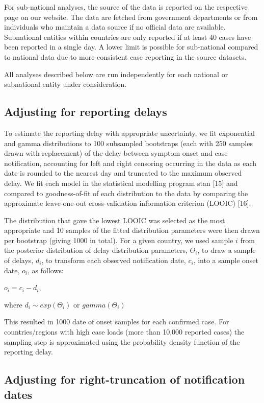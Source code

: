 \documentclass[
]{article}
\begin{document}
For sub-national analyses, the source of the data is reported on the
respective page on our website. The data are fetched from government
departments or from individuals who maintain a data source if no
official data are available. Subnational entities within countries are
only reported if at least 40 cases have been reported in a single day. A
lower limit is possible for sub-national compared to national data due
to more consistent case reporting in the source datasets.

All analyses described below are run independently for each national or
subnational entity under consideration.

\hypertarget{adjusting-for-reporting-delays}{%
\subsection{Adjusting for reporting
delays}\label{adjusting-for-reporting-delays}}

To estimate the reporting delay with appropriate uncertainty, we fit
exponential and gamma distributions to 100 subsampled bootstraps (each
with 250 samples drawn with replacement) of the delay between symptom
onset and case notification, accounting for left and right censoring
occurring in the data as each date is rounded to the nearest day and
truncated to the maximum observed delay. We fit each model in the
statistical modelling program stan {[}15{]} and compared to
goodness-of-fit of each distribution to the data by comparing the
approximate leave-one-out cross-validation information criterion (LOOIC)
{[}16{]}.

The distribution that gave the lowest LOOIC was selected as the most
appropriate and 10 samples of the fitted distribution parameters were
then drawn per bootstrap (giving 1000 in total). For a given country, we
used sample \(i\) from the posterior distribution of delay distribution
parameters, \(\Theta_i\), to draw a sample of delays, \(d_i\), to
transform each observed notification date, \(c_i\), into a sample onset
date, \(o_i\), as follows:

\(o_i = c_i - d_i\),

where \(d_i \sim exp(\Theta_i)\) or \(gamma(\Theta_i)\)

This resulted in 1000 date of onset samples for each confirmed case. For
countries/regions with high case loads (more than 10,000 reported cases)
the sampling step is approximated using the probability density function
of the reporting delay.

\hypertarget{adjusting-for-right-truncation-of-notification-dates}{%
\subsection{Adjusting for right-truncation of notification
dates}\label{adjusting-for-right-truncation-of-notification-dates}}
\end{document}
